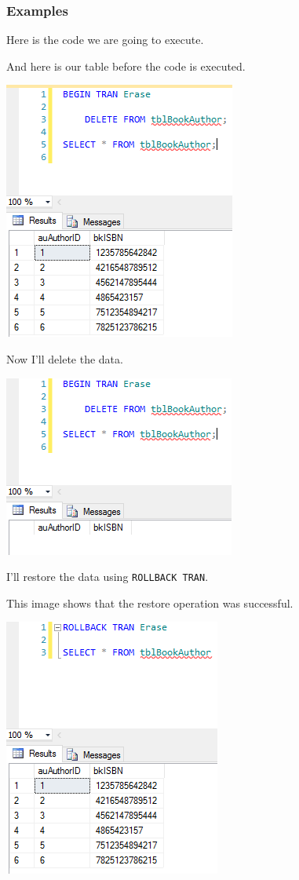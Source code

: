 \documentclass[11pt,a4paper]{scrartcl}
\begin{document}
	\subsubsection*{Examples}
	
	Here is the code we are going to execute.
	
	
	
	And here is our table before the code is executed.
	
	\begin{center}
		\includegraphics[width=0.45\linewidth]{images/RollbackBeforeDelete}
	\end{center}
	
	Now I'll delete the data.
	
	\begin{center}
		\includegraphics[width=0.45\linewidth]{images/RollbackAfterDelete}
	\end{center}
	
	I'll restore the data using \texttt{ROLLBACK TRAN}.
	
	
	
	This image shows that the restore operation was successful.
	
	\begin{center}
		\includegraphics[width=0.45\linewidth]{images/RollbackRestore}
	\end{center}
	
\end{document}
